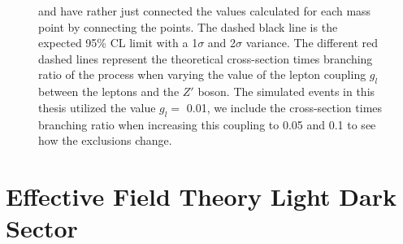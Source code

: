 \documentclass[12pt, a4paper]{book}
\begin{document}
\begin{figure}[!ht]
{   and have rather just connected the values calculated for each mass point by connecting the points. The dashed black line is the expected 95\% CL limit with a 1$\sigma$ and 2$\sigma$ variance. 
   The different red dashed lines represent the theoretical cross-section times branching ratio of the process when varying the value of the lepton coupling $g_l$ between the leptons and the $Z'$ boson. The simulated events in this thesis utilized the value $g_l=$ 0.01, we include the cross-section times branching ratio when increasing this coupling to 0.05 and 0.1 to see how the exclusions change.  }\label{fig:EFT_HDS_me_SRS}
\end{figure}







\clearpage
\section{Effective Field Theory Light Dark Sector}
\end{document}

